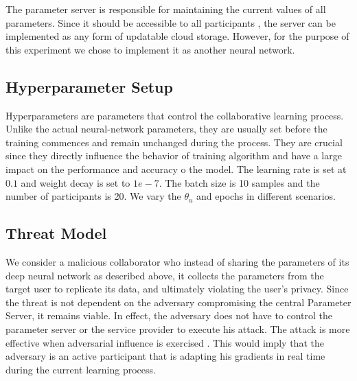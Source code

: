 \documentclass[conference]{IEEEtran}
\begin{document}
The parameter server is responsible for maintaining the current values of all parameters. Since it should be accessible to all participants , the server can be implemented as any form of updatable cloud storage. However, for the purpose of this experiment we chose to implement it as another neural network. 

\subsection{Hyperparameter Setup}

Hyperparameters are parameters that control the collaborative learning process. Unlike the actual neural-network parameters, they are usually set before the training commences and remain unchanged during the process.
They are crucial since they directly influence the behavior of training algorithm and have a large impact on the performance and accuracy o the model.
The learning rate is set at $0.1$ and weight decay is set to $1e-7$. The batch size is 10 samples and the number of participants is 20. We vary the $\theta_u$ and epochs in different scenarios. 

\subsection{Threat Model}

We consider a malicious collaborator who instead of sharing the parameters of its deep neural
network as described above, it collects the parameters from the target user to replicate its data, and ultimately violating the user's
privacy.  
Since the threat is not{} dependent on the adversary compromising the
central Parameter Server, it remains viable. In effect, the adversary does not have to control the parameter server or the service
provider to execute his attack. The attack is more effective when adversarial influence is exercised \cite{hitaj2017deep}. This would
imply that
the adversary is an active participant that is adapting his gradients in real time during the current learning process.

\end{document}
